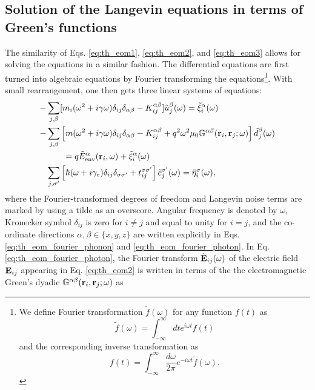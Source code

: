 \subsection{Solution of the Langevin equations in terms of Green's functions}
\label{sec:th_eom_solution}
The similarity of Eqs. \eqref{eq:th_eom1}, \eqref{eq:th_eom2}, and \eqref{eq:th_eom3} allows for solving the equations in a similar fashion. The differential equations are first turned into algebraic equations by Fourier transforming the equations\footnote{We define Fourier transformation $\tilde f(\omega)$ for any function $f(t)$ as
\begin{equation}
 \tilde f(\omega) = \int_{-\infty}^{\infty} dt e^{i\omega t} f(t) \label{eq:th_fourier}
\end{equation}
and the corresponding inverse transformation as
\begin{equation}
 f(t) = \int_{-\infty}^{\infty} \frac{d\omega}{2\pi} e^{-i\omega t}\tilde f(\omega). \label{eq:th_fourier_inv}
\end{equation}}.
With small rearrangement, one then gets three linear systems of equations:
\begin{subequations}
\begin{align}
   - & \sum_{j,\beta}  [m_i (\omega^2+i\gamma \omega) \delta_{ij}\delta_{\alpha\beta} - K_{ij}^{\alpha\beta}] \tilde{u}_j^{\beta}(\omega) = \tilde \xi_i^{\alpha}(\omega) \label{eq:th_eom_fourier_phonon} \\
  - &  \sum_{j,\beta} \left[m(\omega^2+i\gamma\omega) \delta_{ij}\delta_{\alpha\beta} - K_{ij}^{\alpha\beta} +q^2 \omega^2 \mu_0 \mathbb{G}^{\alpha\beta}(\mathbf{r}_i,\mathbf{r}_j;\omega) \right]\tilde{d}_j^{\beta}(\omega) \notag \\
  & \qquad = q\tilde{E}_{\textrm{env}}^{\alpha}(\mathbf{r}_i,\omega) + \tilde{\xi}^{\alpha}_i(\omega) \label{eq:th_eom_fourier_photon} \\ 
  &  \sum_{j,\sigma'} \left[\hbar (\omega+i\gamma_e) \delta_{ij}\delta_{\sigma\sigma'} + t_{ij}^{\sigma\sigma'} \right] \tilde c_j^{\sigma'}(\omega) = \tilde \eta_i^{\sigma}(\omega)  ,  \label{eq:th_eom_fourier_electron}
\end{align}
\end{subequations}
where the Fourier-transformed degrees of freedom and Langevin noise terms are marked by using a tilde as an overscore. Angular frequency is denoted by $\omega$, Kronecker symbol $\delta_{ij}$ is zero for $i\neq j$ and equal to unity for $i=j$, and the co-ordinate directions $\alpha,\beta \in \{x,y,z\}$ are written explicitly in Eqs. \eqref{eq:th_eom_fourier_phonon} and \eqref{eq:th_eom_fourier_photon}. In Eq. \eqref{eq:th_eom_fourier_photon}, the Fourier transform $\tilde{\mathbf{E}}_{ij}(\omega)$ of the electric field $\mathbf{E}_{ij}$ appearing in Eq. \eqref{eq:th_eom2} is written in terms of the the electromagnetic Green's dyadic $\mathbb{G}^{\alpha\beta}(\mathbf{r}_i,\mathbf{r}_j;\omega)$ as \cite{novotny}
